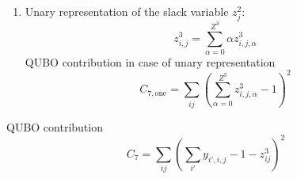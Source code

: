 \documentclass{article}
\begin{document}
\begin{itemize}
\begin{enumerate}
        \item 
        Unary representation of the slack variable $z^2_j$:
        \begin{equation*}
            z^3_{i, j} = \sum_{\alpha = 0}^{Z^3} \alpha z^3_{i, j, \alpha}
        \end{equation*}
        QUBO contribution in case of unary representation
        \begin{equation*}
            C_{7, \text{one}} = \sum_{ij} \left( \sum_{\alpha = 0}^{Z^3} z^3_{i, j, \alpha} - 1 \right)^2
        \end{equation*}
    \end{enumerate}
    QUBO contribution
    \begin{equation*}
        C_7 = \sum_{ij} \left(\sum_{i'} y_{i', i, j} - 1 -  z^3_{ij} \right)^2
    \end{equation*}
\end{itemize}
\end{document}
